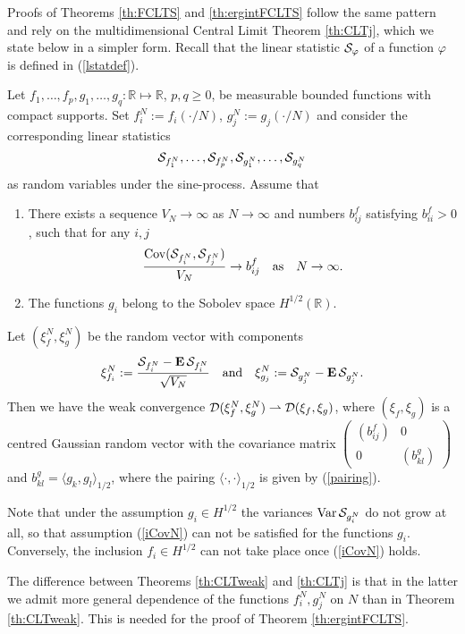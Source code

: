 \documentclass{article}
\numberwithin{equation}{section}
\newcommand{\mR}{\mathbb{R}}
\newcommand{\DD}{{\cal D}}
\newcommand{\SSS}{{\cal S}}
\newcommand{\ph}{\varphi}
\newcommand{\Cov}{\operatorname{Cov}}
\newcommand{\Var}{\operatorname{Var}}
\newcommand{\MO}{\mbox{\bf E}\,}
\newcommand{\ra}{\rightarrow}
\newcommand{\ran}{\rangle}
\newcommand{\lan}{\langle}
\newcommand{\raw}{\rightharpoonup}
\newcommand{\fr}{\frac}
\newcommand{\qmb}{\quad\mbox}
\newcommand{\qu}{\quad}
\newcommand{\lbl}{\label}
\newcommand{\ass}{\quad\mbox{as}\quad}
\newcommand{\rtheo}{Theorem \nolinebreak}
\newcommand{\bee}{\begin{equation}}
\newcommand{\eee}{\end{equation}}
\newcommand{\btt}{\begin{theo}}
\newcommand{\ett}{\end{theo}}
\begin{document}
Proofs of Theorems \ref{th:FCLTS} and \ref{th:ergintFCLTS}
follow the same pattern
and rely on the multidimensional Central Limit Theorem
\nolinebreak \ref{th:CLTj},
which we state below in a simpler form.
Recall that the linear statistic $\SSS_\ph$ of a function $\ph$
is defined in (\ref{lstatdef}).
\btt\lbl{th:CLTweak}
Let $f_1,\ldots,f_p,g_1,\ldots,g_q:\mR\mapsto\mR$, $p,q\geq 0$,
be measurable bounded functions
with compact supports.
Set $f_i^N:=f_i(\cdot/N)$, $g_j^N:=g_j(\cdot/N)$ and
consider the corresponding linear statistics
$$
\SSS_{f_1^N},\ldots, \SSS_{f_p^N}, \SSS_{g_1^N},\ldots, \SSS_{g_q^N}
$$
as random variables under the sine-process.
Assume that
\begin{enumerate}
\item
There exists a sequence
$V_N\ra\infty$ as $N\ra\infty$
and numbers $b_{ij}^f$ satisfying $b_{ii}^f>0$,
such that for any $i,j$
\bee\lbl{iCovN}
\fr{\Cov(\SSS_{f_i^N},\SSS_{f_j^N})}{V_N} \ra b^f_{ij} \ass N\ra\infty.
\eee

\item
The functions $g_i$
belong to the Sobolev space $H^{1/2}(\mR)$.
\end{enumerate}
Let $(\xi^N_f,\xi^N_g)$ be the random vector with components
$$
\xi^N_{f_i}:=\fr{\SSS_{f_i^N} -\MO\SSS_{f_i^N}}{\sqrt{V_N}}
\qmb{and}\qu
\xi^N_{g_j}:=\SSS_{g_j^N} -\MO\SSS_{g_j^N}.
$$
Then we have the weak convergence
$\DD(\xi^N_f,\xi^N_g) \raw \DD(\xi_f,\xi_g)$,
where $(\xi_f,\xi_g)$ is a centred Gaussian random vector
with the covariance matrix
$\begin{pmatrix}
(b^f_{ij})&0 \\
0&(b^g_{kl})
\end{pmatrix}$
and $b^g_{kl} = \lan g_k,g_l\ran_{1/2} $,
where the pairing $\lan\cdot,\cdot\ran_{1/2}$
is given by (\ref{pairing}).
\ett
Note that under the assumption $g_i\in H^{1/2}$
the variances $\Var\SSS_{g^N_i}$ do not grow at all,
so that assumption (\ref{iCovN})
can not be satisfied for the functions $g_i$.
Conversely, the inclusion $f_i\in H^{1/2}$
can not take place once (\ref{iCovN}) holds.

The difference between Theorems \ref{th:CLTweak} and \ref{th:CLTj}
is that in the latter we admit more general
dependence of the functions $f^N_i, g^N_j$
on $N$ than in \rtheo \ref{th:CLTweak}.
This is needed for the proof of \rtheo\ref{th:ergintFCLTS}.
\end{document}
